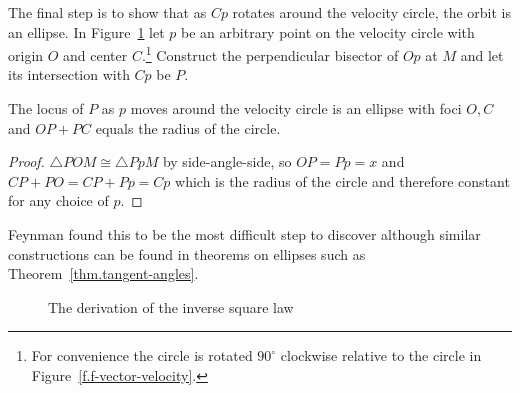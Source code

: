 The final step is to show that as $Cp$ rotates around the velocity circle, the orbit is an ellipse. In Figure~\ref{f.f-elliptical-orbit} let $p$ be an arbitrary point on the velocity circle with origin $O$ and center $C$.\footnote{For convenience the circle is rotated $90^\circ$ clockwise relative to the circle in Figure~\ref{f.f-vector-velocity}.} Construct the perpendicular bisector of $Op$ at $M$ and let its intersection with $Cp$ be $P$.

\newpage

\begin{theorem}
The locus of $P$ as $p$ moves around the velocity circle is an ellipse with foci $O,C$ and $OP+PC$ equals the radius of the circle.
\end{theorem}
\begin{proof}
$\triangle POM\cong \triangle PpM$ by side-angle-side, so $OP=Pp=x$ and $CP+PO=CP+Pp=Cp$ which is the radius of the circle and therefore constant for any choice of $p$.\fqed
\end{proof} 

Feynman found this to be the most difficult step to discover \cite[p.~130]{lost} although similar constructions can be found in theorems on ellipses such as Theorem~\ref{thm.tangent-angles}.


\begin{figure}
\begin{center}
\caption{The derivation of the inverse square law}\label{f.f-elliptical-orbit}
\end{center}
\end{figure}

